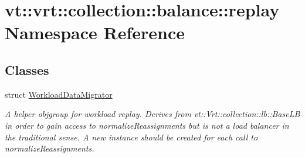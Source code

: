 \hypertarget{namespacevt_1_1vrt_1_1collection_1_1balance_1_1replay}{}\section{vt\+:\+:vrt\+:\+:collection\+:\+:balance\+:\+:replay Namespace Reference}
\label{namespacevt_1_1vrt_1_1collection_1_1balance_1_1replay}
\subsection*{Classes}
\begin{DoxyCompactItemize}
\item 
struct \hyperlink{structvt_1_1vrt_1_1collection_1_1balance_1_1replay_1_1_workload_data_migrator}{Workload\+Data\+Migrator}
\begin{DoxyCompactList}\small\item\em A helper objgroup for workload replay. Derives from {\ttfamily vt\+::\+Vrt\+::collection\+::lb\+::\+Base\+LB} in order to gain access to normalize\+Reassignments but is not a load balancer in the traditional sense. A new instance should be created for each call to normalize\+Reassignments. \end{DoxyCompactList}\end{DoxyCompactItemize}
